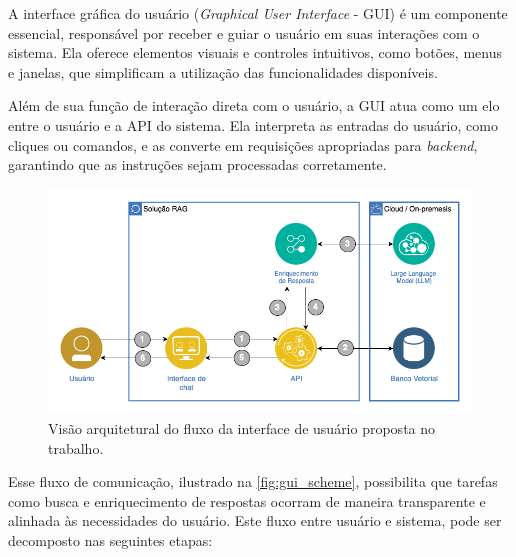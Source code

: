 \documentclass[a4paper, 12pt]{article}
\begin{document}
    A interface gráfica do usuário (\textit{Graphical User Interface} - GUI) é um componente essencial, responsável por receber e guiar o usuário em suas interações com o sistema. Ela oferece elementos visuais e controles intuitivos, como botões, menus e janelas, que simplificam a utilização das funcionalidades disponíveis.

    Além de sua função de interação direta com o usuário, a GUI atua como um elo entre o usuário e a API do sistema. Ela interpreta as entradas do usuário, como cliques ou comandos, e as converte em requisições apropriadas para \textit{backend}, garantindo que as instruções sejam processadas corretamente.

    \begin{figure}[ht]
        \includegraphics[width=\textwidth,height=0.9\textheight,keepaspectratio]{architecture-solution.png}
        \centering
        \caption{Visão arquitetural do fluxo da interface de usuário proposta no trabalho.}
        \centering
        \label{fig:gui_scheme}
    \end{figure}

    Esse fluxo de comunicação, ilustrado na \autoref{fig:gui_scheme}, possibilita que tarefas como busca e enriquecimento de respostas ocorram de maneira transparente e alinhada às necessidades do usuário. Este fluxo entre usuário e sistema, pode ser decomposto nas seguintes etapas:
\end{document}
